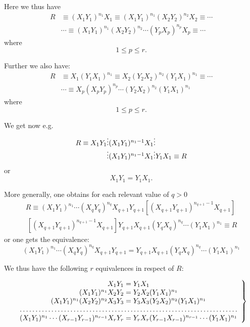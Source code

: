 Here we thus have
$$\begin{array}{cc}
R & \equiv (X_1Y_1)^{n_1}X_1 \equiv (X_1Y_1)^{n_1}(X_2Y_2)^{n_2}X_2
\equiv \cdots \\
 & \cdots \equiv (X_1Y_1)^{n_1}(X_2Y_2)^{n_2} \cdots (Y_pX_p)^{n_p}X_p
\equiv \cdots 
\end{array}$$
where
$$1 \leq p \leq r.$$

Further we also have:
$$\begin{array}{cc}
R & \equiv X_1(Y_1X_1)^{n_1} \equiv X_2(Y_2X_2)^{n_2}(Y_1X_1)^{n_1}
\equiv \cdots \\
 & \cdots \equiv X_p(X_pY_p)^{n_p}  \cdots (Y_2X_2)^{n_2}(Y_1X_1)^{n_1}
\end{array}$$
where
$$1 \leq p \leq r.$$

We get now e.g.
$$\begin{array}{c@{\vdots}c@{\vdots}c}
R \equiv X_1Y_1 & (X_1Y_1)^{n_1-1}X_1 & \\
               & (X_1Y_1)^{n_1-1}X_1 & Y_1X_1 \equiv R\\
\end{array}$$
or
$$X_1Y_1 = Y_1X_1.$$

More generally, one obtains for each relevant value of $q > 0$
\begin{gather*}
R \equiv (X_1Y_1)^{n_1} \cdots (X_{q}Y_{q})^{n_{q}} X_{q+1} Y_{q+1}
[ (X_{q+1}Y_{q+1})^{n_{q+1}-1}  X_{q+1} ]\\ ~
[ (X_{q+1}Y_{q+1})^{n_{q+1}-1}  X_{q+1} ]
Y_{q+1} X_{q+1} (Y_{q}X_{q})^{n_{q}}  \cdots  (Y_1X_1)^{n_1} \equiv R
\end{gather*}
or one gets the equivalence:
$$
(X_1Y_1)^{n_1} \cdots (X_{q}Y_{q})^{n_{q}} X_{q+1} Y_{q+1}
=
Y_{q+1} X_{q+1} (Y_{q}X_{q})^{n_{q}}  \cdots  (Y_1X_1)^{n_1}
$$

We thus have the following $r$ equivalences in respect of $R$:

\parbox{1.2\textwidth}{\begin{equation}
\left.\begin{array}{c}
X_1Y_1 = Y_1X_1 \\
(X_1Y_1)^{n_1} X_2Y_2 = Y_2X_2 (Y_1X_1)^{n_1}\\
(X_1Y_1)^{n_1} (X_2Y_2)^{n_2} X_3Y_3 = Y_3X_3
(Y_2X_2)^{n_2}(Y_1X_1)^{n_1}\\
\hdotsfor{1} \\
(X_1Y_1)^{n_1} \cdots (X_{r-1}Y_{r-1})^{n_{r-1}} X_rY_r = Y_rX_r
(Y_{r-1}X_{r-1})^{n_{r-1}} \cdots (Y_1X_1)^{n_1}\\
\end{array}\right\}
\label{eq:seven}
\end{equation}
}


